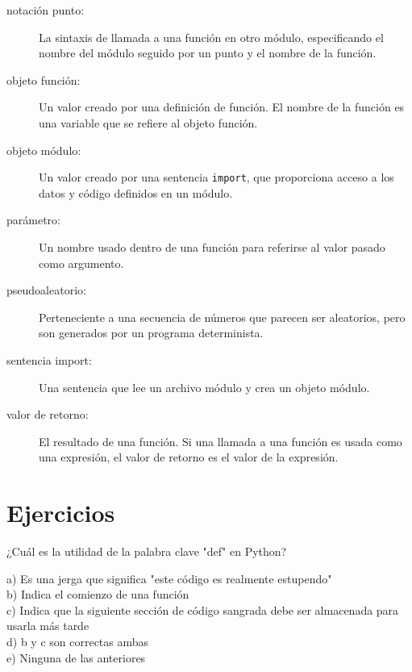 \begin{description}
\item[notación punto:] La sintaxis de llamada a una función en
otro módulo, especificando el nombre del módulo seguido por un punto y el
nombre de la función.

\item[objeto función:]  Un valor creado por una definición de función.
El nombre de la función es una variable que se refiere al objeto
función.

\item[objeto módulo:] Un valor creado por una sentencia {\tt import},
que proporciona acceso a los datos y código definidos en un módulo.

\item[parámetro:] Un nombre usado dentro de una función para referirse al valor
pasado como argumento.

\item[pseudoaleatorio:] Perteneciente a una secuencia de números que parecen
ser aleatorios, pero son generados por un programa determinista.

\item[sentencia import:] Una sentencia que lee un archivo módulo y crea
un objeto módulo.

\item[valor de retorno:] El resultado de una función. Si una llamada a una función
es usada como una expresión, el valor de retorno es el valor de la expresión.

\end{description}


\section{Ejercicios}

\begin{ex}
¿Cuál es la utilidad de la palabra clave "def" en Python?

a) Es una jerga que significa "este código es realmente estupendo"\\
b) Indica el comienzo de una función\\
c) Indica que la siguiente sección de código sangrada debe ser almacenada para usarla más tarde\\
d) b y c son correctas ambas\\
e) Ninguna de las anteriores
\end{ex}

